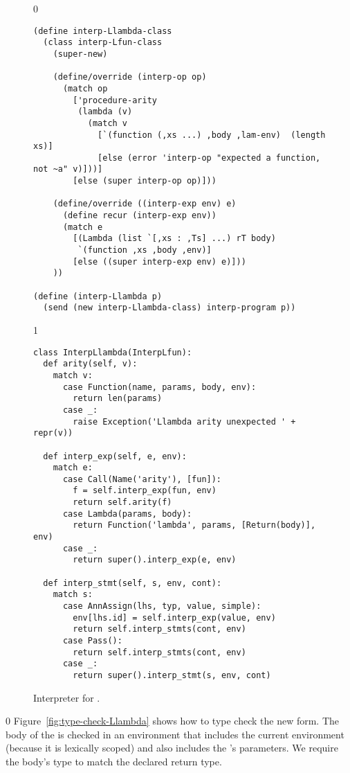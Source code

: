 \documentclass[7x10]{TimesAPriori_MIT}%
\def\racketEd{0}
\def\pythonEd{1}
\def\edition{1}
\newcommand{\pythonColor}[0]{}
\numberwithin{theorem}{chapter}
\numberwithin{definition}{chapter}
\numberwithin{equation}{chapter}
\begin{document}
\begin{figure}[tbp]
  \begin{tcolorbox}[colback=white]
    {\if\edition\racketEd 
\begin{lstlisting}
(define interp-Llambda-class
  (class interp-Lfun-class
    (super-new)

    (define/override (interp-op op)
      (match op
        ['procedure-arity
         (lambda (v)
           (match v
             [`(function (,xs ...) ,body ,lam-env)  (length xs)]
             [else (error 'interp-op "expected a function, not ~a" v)]))]
        [else (super interp-op op)]))

    (define/override ((interp-exp env) e)
      (define recur (interp-exp env))
      (match e
        [(Lambda (list `[,xs : ,Ts] ...) rT body)
         `(function ,xs ,body ,env)]
        [else ((super interp-exp env) e)]))
    ))

(define (interp-Llambda p)
  (send (new interp-Llambda-class) interp-program p))
\end{lstlisting}
\fi}
{\if\edition\pythonEd\pythonColor
\begin{lstlisting}
class InterpLlambda(InterpLfun):
  def arity(self, v):
    match v:
      case Function(name, params, body, env):
        return len(params)
      case _:
        raise Exception('Llambda arity unexpected ' + repr(v))
      
  def interp_exp(self, e, env):
    match e:
      case Call(Name('arity'), [fun]):
        f = self.interp_exp(fun, env)
        return self.arity(f)
      case Lambda(params, body):
        return Function('lambda', params, [Return(body)], env)
      case _:
        return super().interp_exp(e, env)
    
  def interp_stmt(self, s, env, cont):
    match s:
      case AnnAssign(lhs, typ, value, simple):
        env[lhs.id] = self.interp_exp(value, env)
        return self.interp_stmts(cont, env)
      case Pass():
        return self.interp_stmts(cont, env)
      case _:
        return super().interp_stmt(s, env, cont)
\end{lstlisting}
\fi}
  \end{tcolorbox}

  \caption{Interpreter for \LangLam{}.}
\label{fig:interp-Llambda}
\end{figure}


{\if\edition\racketEd
%
Figure~\ref{fig:type-check-Llambda} shows how to type check the new
 form. The body of the  is checked in an
environment that includes the current environment (because it is
lexically scoped) and also includes the 's parameters.  We
require the body's type to match the declared return type.
%
\fi}
\end{document}

